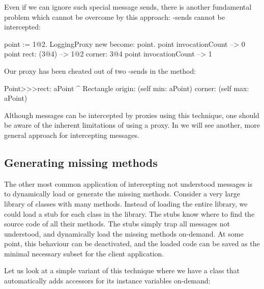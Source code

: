 \documentclass[a4paper,10pt,twoside]{book}
\begin{document}
Even if we can ignore such special message sends, there is another fundamental problem which cannot be overcome by this approach: \self-sends cannot be intercepted:
\begin{code}{}
point := 1@2.
LoggingProxy new become: point.
point invocationCount --> 0
point rect: (3@4)        --> 1@2 corner: 3@4
point invocationCount --> 1
\end{code}

Our proxy has been cheated out of two \self-sends in the  method:
\begin{code}{}
Point>>>rect: aPoint
        ^ Rectangle  origin: (self min: aPoint) corner: (self max: aPoint)
\end{code}

Although messages can be intercepted by proxies using this technique, one should be aware of the inherent limitations of using a proxy.  In  we will see another, more general approach for intercepting messages.

\subsection{Generating missing methods}

The other most common application of intercepting not understood messages is to dynamically load or generate the missing methods.
Consider a very large library of classes with many methods.  Instead of loading the entire library, we could load a stub for each class in the library. The stubs know where to find the source code of all their methods.  The stubs simply trap all messages not understood, and dynamically load the missing methods on-demand.  At some point, this behaviour can be deactivated, and the loaded code can be saved as the minimal necessary subset for the client application.


Let us look at a simple variant of this technique where we have a class that automatically adds accessors for its instance variables on-demand:
\end{document}
